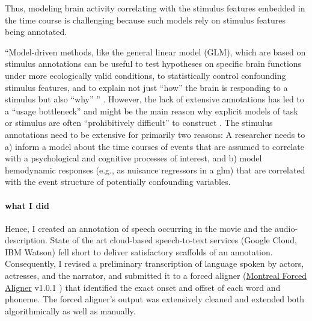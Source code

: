 %
Thus, modeling brain activity correlating with the stimulus features embedded in
the time course is challenging \citep{saarimaki2021naturalistic,
simony2020analysis} because such models rely on stimulus features being
annotated.

``Model-driven methods, like the general linear model (GLM), which are based on
stimulus annotations can be useful to test hypotheses on specific brain
functions under more ecologically valid conditions, to statistically control
confounding stimulus features, and to explain not just ``how'' the brain is
responding to a stimulus but also ``why'' \citep{hamilton2018revolution}''
\citep{haeusler2022processing}.
%
However, the lack of extensive annotations has led to a ``usage bottleneck''
\citep{aliko2020naturalistic} and might be the main reason why explicit models
of task or stimulus are often ``prohibitively difficult'' to construct
\citep{nastase2019measuring}.
%
The stimulus annotations need to be extensive for primarily two reasons:
%
A researcher needs to a) inform a model about the time courses of events that
are assumed to correlate with a psychological and cognitive processes of
interest, and b) model hemodynamic responses (e.g., as nuisance regressors in a
\ac{glm}) that are correlated with the event structure of potentially
confounding variables.


\paragraph{what I did}
Hence, I created an annotation of speech occurring in the movie and the
audio-description.
State of the art cloud-based speech-to-text services (Google Cloud, IBM Watson)
fell short to deliver satisfactory scaffolds of an annotation.
Consequently, I revised a preliminary transcription of language spoken by
actors, actresses, and the narrator, and submitted it to a forced aligner
(\href{https://github.com/MontrealCorpusTools/Montreal-Forced-Aligner}{Montreal
Forced Aligner} v1.0.1 \citep{mcauliffe2017montreal}) that identified the exact
onset and offset of each word and phoneme. The forced aligner's output was
extensively cleaned and extended both algorithmically as well as manually.


